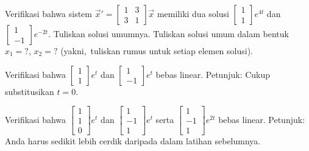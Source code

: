 \begin{exercise}
\leavevmode
\begin{tasks}
\task
Verifikasi bahwa sistem ${\vec{x}}' =
\left[ \begin{smallmatrix}
1 & 3 \\ 3 & 1
\end{smallmatrix} \right] \vec{x}$ memiliki dua solusi
$\left[ \begin{smallmatrix}
1 \\ 1
\end{smallmatrix} \right] e^{4t}$ dan
$\left[ \begin{smallmatrix}
1 \\ -1
\end{smallmatrix} \right] e^{-2t}$.
\task Tuliskan solusi umumnya.
\task Tuliskan solusi umum dalam bentuk $x_1 = ?$, $x_2 = ?$
(yakni,\ tuliskan rumus untuk setiap elemen solusi).
\end{tasks}
\end{exercise}

\begin{exercise}
Verifikasi bahwa
$\left[ \begin{smallmatrix}
1 \\ 1
\end{smallmatrix} \right] e^{t}$ dan
$\left[ \begin{smallmatrix}
1 \\ -1
\end{smallmatrix} \right] e^{t}$
bebas linear.  Petunjuk: Cukup substitusikan $t=0$.
\end{exercise}

\begin{exercise}
Verifikasi bahwa
$\left[ \begin{smallmatrix}
1 \\ 1 \\ 0
\end{smallmatrix} \right] e^{t}$ dan
$\left[ \begin{smallmatrix}
1 \\ -1 \\ 1
\end{smallmatrix} \right] e^{t}$
serta
$\left[ \begin{smallmatrix}
1 \\ -1 \\ 1
\end{smallmatrix} \right] e^{2t}$
bebas linear.  Petunjuk: Anda harus sedikit lebih cerdik daripada dalam
latihan sebelumnya.
\end{exercise}


